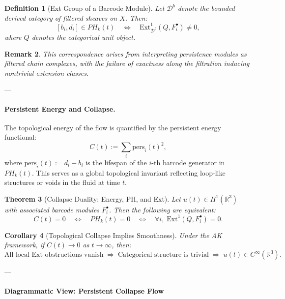 \documentclass[11pt]{article}
\newtheorem{theorem}{Theorem}[section]
\newtheorem{definition}[theorem]{Definition}
\newtheorem{remark}[theorem]{Remark}
\newtheorem{corollary}[theorem]{Corollary}
\begin{document}
\begin{definition}[Ext Group of a Barcode Module]
Let \( \mathcal{D}^b \) denote the bounded derived category of filtered sheaves on \( X \).  
Then:
\[
[b_i, d_i] \in PH_k(t) 
\quad \Longleftrightarrow \quad 
\mathrm{Ext}^1_{\mathcal{D}^b}(Q, F^\bullet_i) \neq 0,
\]
where \( Q \) denotes the categorical unit object.
\end{definition}

\begin{remark}
This correspondence arises from interpreting persistence modules as filtered chain complexes,  
with the failure of exactness along the filtration inducing nontrivial extension classes.
\end{remark}

---

\paragraph{Persistent Energy and Collapse.}

The topological energy of the flow is quantified by the persistent energy functional:
\[
C(t) := \sum_{i} \mathrm{pers}_i(t)^2,
\]
where \( \mathrm{pers}_i(t) := d_i - b_i \) is the lifespan of the \( i \)-th barcode generator in \( PH_k(t) \).  
This serves as a global topological invariant reflecting loop-like structures or voids in the fluid at time \( t \).

\begin{theorem}[Collapse Duality: Energy, PH, and Ext]
Let \( u(t) \in H^1(\mathbb{R}^3) \) with associated barcode modules \( F^\bullet_i \). Then the following are equivalent:
\[
C(t) = 0 
\quad \Longleftrightarrow \quad 
PH_k(t) = 0 
\quad \Longleftrightarrow \quad 
\forall i,\; \mathrm{Ext}^1(Q, F^\bullet_i) = 0.
\]
\end{theorem}

\begin{corollary}[Topological Collapse Implies Smoothness]
Under the AK framework, if \( C(t) \to 0 \) as \( t \to \infty \), then:
\[
\text{All local Ext obstructions vanish} 
\;\Rightarrow\; 
\text{Categorical structure is trivial} 
\;\Rightarrow\; 
u(t) \in C^\infty(\mathbb{R}^3).
\]
\end{corollary}

---

\paragraph{Diagrammatic View: Persistent Collapse Flow}
\end{document}

